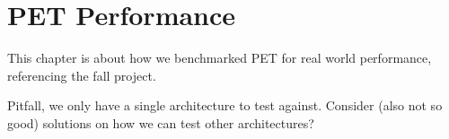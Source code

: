 \chapter{PET Performance}

This chapter is about how we benchmarked PET for real world performance, referencing the fall project.

Pitfall, we only have a single architecture to test against. Consider (also not so good) solutions on how we can test other architectures?





